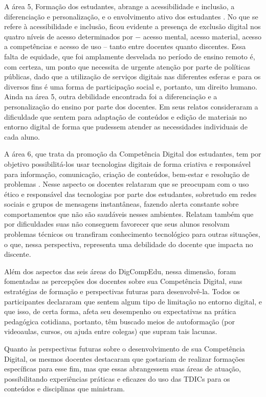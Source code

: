 \documentclass[portuguese]{textolivre}
\begin{document}
A área 5, Formação dos estudantes, abrange a acessibilidade e inclusão, a diferenciação e personalização, e o envolvimento ativo dos estudantes \cite{lucas2018}. No que se refere à acessibilidade e inclusão, ficou evidente a presença de exclusão digital nos quatro níveis de acesso determinados por \textcite{vandijk2003} − acesso mental, acesso material, acesso a competências e acesso de uso – tanto entre docentes quanto discentes. Essa falta de equidade, que foi amplamente desvelada no período de ensino remoto é, com certeza, um ponto que necessita de urgente atenção por parte de políticas públicas, dado que a utilização de serviços digitais nas diferentes esferas e para os diversos fins é uma forma de participação social e, portanto, um direito humano. Ainda na área 5, outra debilidade encontrada foi a diferenciação e a personalização do ensino por parte dos docentes. Em seus relatos consideraram a dificuldade que sentem para adaptação de conteúdos e edição de materiais no entorno digital de forma que pudessem atender as necessidades individuais de cada aluno.

A área 6, que trata da promoção da Competência Digital dos estudantes, tem por objetivo possibilitá-los usar tecnologias digitais de forma criativa e responsável para informação, comunicação, criação de conteúdos, bem-estar e resolução de problemas \cite{lucas2018}. Nesse aspecto os docentes relataram que se preocupam com o uso ético e responsável das tecnologias por parte dos estudantes, sobretudo em redes sociais e grupos de mensagens instantâneas, fazendo alerta constante sobre comportamentos que não são saudáveis nesses ambientes. Relatam também que por dificuldades suas não conseguem favorecer que seus alunos resolvam problemas técnicos ou transfiram conhecimento tecnológico para outras situações, o que, nessa perspectiva, representa uma debilidade do docente que impacta no discente.

Além dos aspectos das seis áreas do DigCompEdu, nessa dimensão, foram fomentadas as percepções dos docentes sobre sua Competência Digital, suas estratégias de formação e perspectivas futuras para desenvolvê-la. Todos os participantes declararam que sentem algum tipo de limitação no entorno digital, e que isso, de certa forma, afeta seu desempenho ou expectativas na prática pedagógica cotidiana, portanto, têm buscado meios de autoformação (por videoaulas, cursos, ou ajuda entre colegas) que supram tais lacunas. 

Quanto às perspectivas futuras sobre o desenvolvimento de sua Competência Digital, os mesmos docentes destacaram que gostariam de realizar formações específicas para esse fim, mas que essas abrangessem suas áreas de atuação, possibilitando experiências práticas e eficazes do uso das TDICs para os conteúdos e disciplinas que ministram. 
\end{document}
